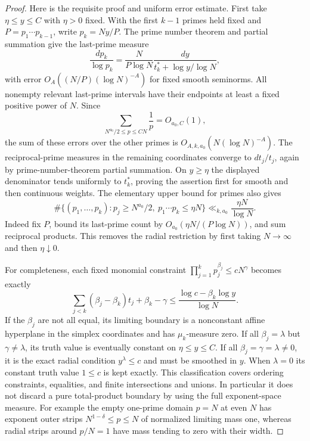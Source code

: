 \documentclass[11pt]{article}
\begin{document}
\begin{proof}
Here is the requisite proof and uniform error estimate. First take
$\eta\le y\le C$ with $\eta>0$ fixed. With the first $k-1$ primes
held fixed and $P=p_1\cdots p_{k-1}$, write $p_k=Ny/P$. The prime
number theorem and partial summation give the last-prime measure
\[
 \frac{dp_k}{\log p_k}
 =\frac{N}{P\log N}\frac{dy}{t_k^*+\log y/\log N},
\]
with error $O_A((N/P)(\log N)^{-A})$ for fixed smooth seminorms.
All nonempty relevant last-prime intervals have their endpoints at
least a fixed positive power of $N$. Since
\[
 \sum_{N^{a_0}/2\le p\le CN}\frac1p=O_{a_0,C}(1),
\]
the sum of these errors over the other primes is
$O_{A,k,a_0}(N(\log N)^{-A})$.
The reciprocal-prime measures in the remaining coordinates converge
to $dt_j/t_j$, again by prime-number-theorem partial summation.
On $y\ge\eta$ the displayed denominator tends uniformly to $t_k^*$,
proving the assertion first for smooth and then continuous weights.
The elementary upper bound for primes also gives
\[
 \#\{(p_1,\ldots,p_k):p_j\ge N^{a_0}/2,\ 
                  p_1\cdots p_k\le\eta N\}
 \ll_{k,a_0}\frac{\eta N}{\log N}.
\]
Indeed fix $P$, bound its last-prime count by
$O_{a_0}(\eta N/(P\log N))$, and sum reciprocal products.
This removes the radial restriction by first taking $N\to\infty$
and then $\eta\downarrow0$.

For completeness, each fixed monomial constraint
$\prod_{j=1}^kp_j^{\beta_j}\le cN^\gamma$ becomes exactly
\[
 \sum_{j<k}(\beta_j-\beta_k)t_j+\beta_k-\gamma
 \le\frac{\log c-\beta_k\log y}{\log N}.
\]
If the $\beta_j$ are not all equal, its limiting boundary is a
nonconstant affine hyperplane in the simplex coordinates and has
$\mu_k$-measure zero. If all $\beta_j=\lambda$ but
$\gamma\ne\lambda$, its truth value is eventually constant on
$\eta\le y\le C$. If all $\beta_j=\gamma=\lambda\ne0$, it is
the exact radial condition $y^\lambda\le c$ and must be smoothed
in $y$. When $\lambda=0$ its constant truth value $1\le c$ is
kept exactly. This classification covers ordering constraints,
equalities, and finite intersections and unions. In particular it
does not discard a pure total-product boundary by using the full
exponent-space measure. For example the empty one-prime domain
$p=N$ at even $N$ has exponent outer strips
$N^{1-\delta}\le p\le N$ of normalized limiting mass one, whereas
radial strips around $p/N=1$ have mass tending to zero with their width.


\end{proof}
\end{document}
